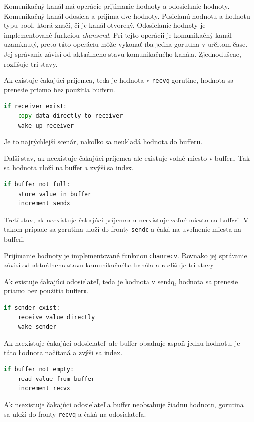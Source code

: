 \documentclass[
  biblatex,
  seconds=true,
  language=slovak,
  figures=false,
  urldate=iso,
  glossaries,
  index
]{kidiplom}
\begin{document}
Komunikačný kanál má operácie prijímanie hodnoty a odosielanie hodnoty. Komunikačný kanál odosiela a prijíma dve hodnoty. Posielanú
hodnotu a hodnotu typu bool, ktorá značí, či je kanál otvorený.
Odosielanie hodnoty je implementované funkciou \emph{chansend}. Pri tejto operácii je komunikačný kanál uzamknutý, preto túto
operáciu môže vykonať iba jedna gorutina v určitom čase.
Jej správanie závisí od aktuálneho stavu komunikačného kanála. Zjednodušene, rozlišuje tri stavy.

Ak existuje čakajúci príjemca, teda
je hodnota v \texttt{recvq} gorutine, hodnota sa prenesie priamo bez použitia bufferu.
\begin{lstlisting}[language=Go]
if receiver exist:
	copy data directly to receiver
	wake up receiver 	
\end{lstlisting}
Je to najrýchlejší scenár, nakoľko sa neukladá hodnota do bufferu. 

Ďalší stav, ak neexistuje čakajúci príjemca ale existuje voľné
miesto v bufferi. Tak sa hodnota uloží na buffer a zvýší sa index.
\newpage
\begin{lstlisting}[language=Go]
if buffer not full:
	store value in buffer 
	increment sendx	
\end{lstlisting}

Tretí stav, ak neexistuje čakajúci príjemca a neexistuje voľné miesto na bufferi. V takom prípade sa gorutina uloží do fronty
\texttt{sendq} a čaká na uvoľnenie miesta na bufferi.

Prijímanie hodnoty je implementované funkciou \texttt{chanrecv}. Rovnako jej správanie závisí od aktuálneho stavu komunikačného
kanála a rozlišuje tri stavy. 

Ak existuje čakajúci odosielateľ, teda je hodnota v sendq, hodnota sa prenesie priamo
bez použitia bufferu.
\begin{lstlisting}[language=Go]
if sender exist:
	receive value directly
	wake sender
\end{lstlisting}

Ak neexistuje čakajúci odosielateľ, ale buffer obsahuje aspoň jednu hodnotu, je táto hodnota načítaná a zvýši sa index.
\begin{lstlisting}[language=Go]
if buffer not empty:
	read value from buffer
	increment recvx	
\end{lstlisting}

Ak neexistuje čakajúci odosielateľ a buffer neobsahuje žiadnu hodnotu, gorutina sa uloží do fronty \texttt{recvq}
a čaká na odosielateľa.
\end{document}
